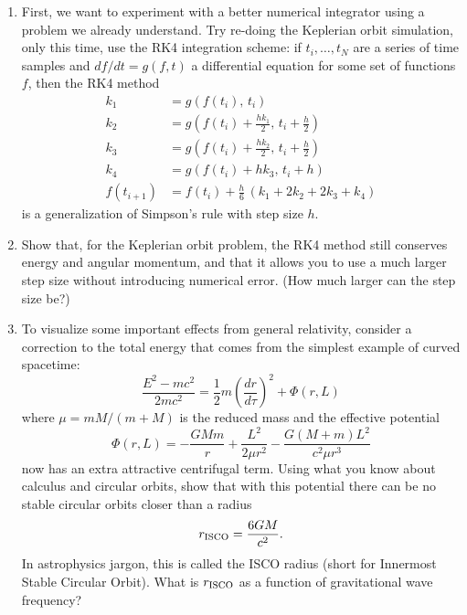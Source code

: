 \documentclass[11pt]{article}
\begin{document}
\begin{enumerate}

\item First, we want to experiment with a better numerical integrator using a problem we already understand. Try re-doing the Keplerian orbit simulation, only this time, use the RK4 integration scheme: if $t_i, \dots, t_N$ are a series of time samples and $df/dt = g(f, t)$ a differential equation for some set of functions $f$, then the RK4 method
\begin{align*}
k_1 &= g(f(t_i), \, t_i) \\
k_2 &= g\left(f(t_i) + \frac{hk_1}{2}, \, t_i + \frac{h}{2}\right) \\
k_3 &= g\left(f(t_i) + \frac{hk_2}{2}, \, t_i + \frac{h}{2}\right) \\
k_4 &= g(f(t_i) + hk_3, \, t_i + h) \\
f(t_{i+1}) &= f(t_i) + \frac{h}{6}\,\left(k_1 + 2k_2 + 2k_3 + k_4\right)
\end{align*}
is a generalization of Simpson's rule with step size $h$.

\item Show that, for the Keplerian orbit problem, the RK4 method still conserves energy and angular momentum, and that it allows you to use a much larger step size without introducing numerical error. (How much larger can the step size be?)

\item To visualize some important effects from general relativity, consider a correction to the total energy that comes from the simplest example of curved spacetime:
\begin{equation}
\frac{E^2 - mc^2}{2mc^2} = \frac{1}{2}m\left(\frac{dr}{d\tau}\right)^2 + \Phi(r, L)
\end{equation}
where $\mu = mM/(m + M)$ is the reduced mass and the effective potential
\begin{equation}\label{eq:potential}
\Phi(r, L) = -\frac{GMm}{r} + \frac{L^2}{2\mu r^2} - \frac{G(M + m)L^2}{c^2\mu r^3}
\end{equation}
now has an extra attractive centrifugal term. Using what you know about calculus and circular orbits, show that with this potential there can be no stable circular orbits closer than a radius
\begin{equation}\label{eq:ISCO}
r_{\rm ISCO} = \frac{6GM}{c^2}.
\end{equation}
In astrophysics jargon, this is called the ISCO radius (short for Innermost Stable Circular Orbit). What is $r_{\rm ISCO}$ as a function of gravitational wave frequency?


\end{enumerate}
\end{document}
